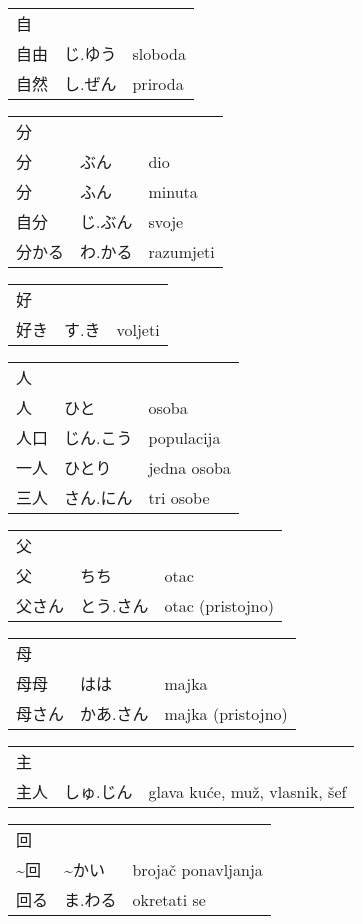 

\newenvironment{dictentry}[1]{
	\begin{tabular}{p{2cm} p{3cm} p{10cm}}
		#1 &&\\
}{
	\end{tabular}
	\vspace{20pt}
}

\newcommand{\example}[3]{
	\hspace*{\fill}#1 & #2 & #3\\
}

\author{ロボット君}


\begin{dictentry}{自}
\example{自由}{じ.ゆう}{sloboda}
\example{自然}{し.ぜん}{priroda}
\end{dictentry}

\begin{dictentry}{分}
\example{分}{ぶん}{dio}
\example{分}{ふん}{minuta}
\example{自分}{じ.ぶん}{svoje}
\example{分かる}{わ.かる}{razumjeti}
\end{dictentry}

\begin{dictentry}{好}
\example{好き}{す.き}{voljeti}
\end{dictentry}

\begin{dictentry}{人}
\example{人}{ひと}{osoba}
\example{人口}{じん.こう}{populacija}
\example{一人}{ひとり}{jedna osoba}
\example{三人}{さん.にん}{tri osobe}
\end{dictentry}

\begin{dictentry}{父}
\example{父}{ちち}{otac}
\example{父さん}{とう.さん}{otac (pristojno)}
\end{dictentry}

\begin{dictentry}{母}
\example{母母}{はは}{majka}
\example{母さん}{かあ.さん}{majka (pristojno)}
\end{dictentry}

\begin{dictentry}{主}
\example{主人}{しゅ.じん}{glava kuće, muž, vlasnik, šef}
\end{dictentry}

\begin{dictentry}{回}
\example{\textasciitilde 回}{\textasciitilde かい}{brojač ponavljanja}
\example{回る}{ま.わる}{okretati se}
\end{dictentry}

